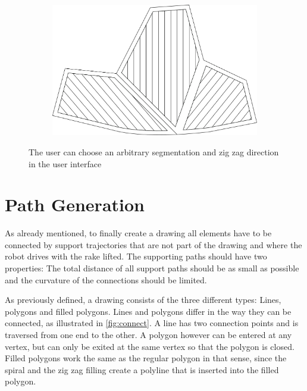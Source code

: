 \begin{figure}
\centering
\begin{subfigure}[b]{0.8\textwidth}
\includegraphics[width=\textwidth]{images/path_planning/zigzag_user_segment_and_fill.pdf}
\end{subfigure}
\caption{The user can choose an arbitrary segmentation and zig zag direction in the user interface}
\end{figure}

\section{Path Generation}
As already mentioned, to finally create a drawing all elements have to be connected by support trajectories that are not part of the drawing and where the robot drives with the rake lifted. The supporting paths should have two properties: The total distance of all support paths should be as small as possible and the curvature of the connections should be limited.

As previously defined, a drawing consists of the three different types: Lines, polygons and filled polygons. Lines and polygons differ in the way they can be connected, as illustrated in \autoref{fig:connect}. A line has two connection points and is traversed from one end to the other. A polygon however can be entered at any vertex, but can only be exited at the same vertex so that the polygon is closed. Filled polygons work the same as the regular polygon in that sense, since the spiral and the zig zag filling create a polyline that is inserted into the filled polygon.

